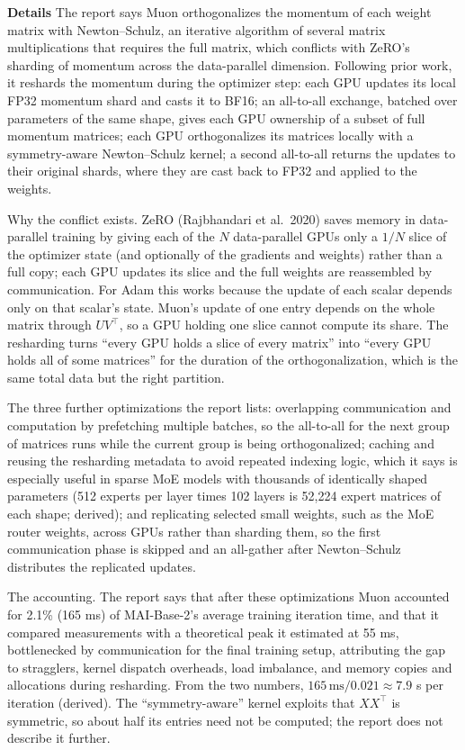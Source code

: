 \documentclass[11pt,letterpaper]{article}
\newcommand{\para}[1]{\medskip\noindent\textbf{#1}\quad}
\begin{document}
\para{Details} The report says Muon orthogonalizes the momentum of each weight matrix with Newton--Schulz, an iterative algorithm of several matrix multiplications that requires the full matrix, which conflicts with ZeRO's sharding of momentum across the data-parallel dimension. Following prior work, it reshards the momentum during the optimizer step: each GPU updates its local FP32 momentum shard and casts it to BF16; an all-to-all exchange, batched over parameters of the same shape, gives each GPU ownership of a subset of full momentum matrices; each GPU orthogonalizes its matrices locally with a symmetry-aware Newton--Schulz kernel; a second all-to-all returns the updates to their original shards, where they are cast back to FP32 and applied to the weights.

Why the conflict exists. ZeRO (Rajbhandari et al.\ 2020) saves memory in data-parallel training by giving each of the $N$ data-parallel GPUs only a $1/N$ slice of the optimizer state (and optionally of the gradients and weights) rather than a full copy; each GPU updates its slice and the full weights are reassembled by communication. For Adam this works because the update of each scalar depends only on that scalar's state. Muon's update of one entry depends on the whole matrix through $UV^{\top}$, so a GPU holding one slice cannot compute its share. The resharding turns ``every GPU holds a slice of every matrix'' into ``every GPU holds all of some matrices'' for the duration of the orthogonalization, which is the same total data but the right partition.

The three further optimizations the report lists: overlapping communication and computation by prefetching multiple batches, so the all-to-all for the next group of matrices runs while the current group is being orthogonalized; caching and reusing the resharding metadata to avoid repeated indexing logic, which it says is especially useful in sparse MoE models with thousands of identically shaped parameters (512 experts per layer times 102 layers is 52,224 expert matrices of each shape; derived); and replicating selected small weights, such as the MoE router weights, across GPUs rather than sharding them, so the first communication phase is skipped and an all-gather after Newton--Schulz distributes the replicated updates.

The accounting. The report says that after these optimizations Muon accounted for 2.1\% (165 ms) of MAI-Base-2's average training iteration time, and that it compared measurements with a theoretical peak it estimated at 55 ms, bottlenecked by communication for the final training setup, attributing the gap to stragglers, kernel dispatch overheads, load imbalance, and memory copies and allocations during resharding. From the two numbers, $165\,\text{ms}/0.021\approx7.9$ s per iteration (derived). The ``symmetry-aware'' kernel exploits that $XX^{\top}$ is symmetric, so about half its entries need not be computed; the report does not describe it further.
\end{document}
